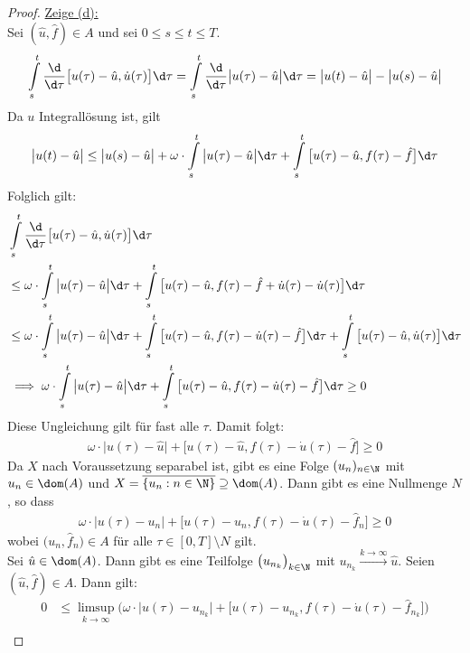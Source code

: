 \begin{proof}
\underline{Zeige (d):}\\
Sei $(\hat{u},\hat{f})\in A$ und sei $0\leq s\leq t\leq T$.
\begin{align*}
\int\limits_s^t\frac{\d}{\d\tau}\big[u(\tau)-\hat{u},\dot{u}(\tau)\big]\d\tau
=\int\limits_s^t\frac{\d}{\d\tau}\big|u(\tau)-\hat{u}\big|\d\tau
=\big|u(t)-\hat{u}\big|-\big|u(s)-\hat{u}\big|
\end{align*}
Da $u$ Integrallösung ist, gilt
\begin{align*}
\big|u(t)-\hat{u}\big|\leq\big| u(s)-\hat{u}\big|+\omega\cdot \int\limits_s^t\big|u(\tau)-\hat{u}\big|\d\tau+\int\limits_s^t\big[u(\tau)-\hat{u},f(\tau)-\hat{f}\big]\d\tau
\end{align*}
Folglich gilt:
\begin{align*}
&\int\limits_s^t\frac{\d}{\d\tau}\big[u(\tau)-\hat{u},\dot{u}(\tau)\big]\d\tau\\
&\leq\omega\cdot\int\limits_s^t\big|u(\tau)-\hat{u}\big|\d\tau+\int\limits_s^t\big[u(\tau)-\hat{u},f(\tau)-\hat{f}+\dot{u}(\tau)-\dot{u}(\tau)\big]\d\tau\\
&\leq\omega\cdot\int\limits_s^t\big| u(\tau)-\hat{u}\big|\d\tau+\int\limits_s^t\big[u(\tau)-\hat{u},f(\tau)-\dot{u}(\tau)-\hat{f}\big]\d\tau
+\int\limits_s^t\big[u(\tau)-\hat{u},\dot{u}(\tau)\big]\d\tau\\
&\implies
\omega\cdot\int\limits_s^t\big|u(\tau)-\hat{u}\big|\d\tau+\int\limits_s^t\big[u(\tau)-\hat{u},f(\tau)-\dot{u}(\tau)-\hat{f}\big]\d\tau\geq0
\end{align*}
Diese Ungleichung gilt für fast alle $\tau$. Damit folgt:
\begin{align*}
\omega\cdot\big|u(\tau)-\hat{u}\big|+\big[u(\tau)-\hat{u},f(\tau)-\dot{u}(\tau)-\hat{f}\big]\geq0
\end{align*}
Da $X$ nach Voraussetzung separabel ist, gibt es eine Folge $(u_n)_{n\in\N}$ mit $u_n\in\dom(A)$ und $X=\overline{\lbrace u_n:n\in\N\rbrace}\supseteq\dom(A)$. Dann gibt es eine Nullmenge $N$, so dass
\begin{align*}
\omega\cdot\big|u(\tau)-u_n\big|+\big[u(\tau)-u_n,f(\tau)-\dot{u}(\tau)-\hat{f}_n\big]\geq0 
\end{align*}
wobei $\big(u_n,\hat{f}_n\big)\in A$ für alle $\tau\in[0,T]\setminus N$ gilt.\\
Sei $\hat{u}\in\dom(A)$. Dann gibt es eine Teilfolge $\big(u_{n_k}\big)_{k\in\N}$ mit $u_{n_k}\stackrel{k\to\infty}{\longrightarrow}\hat{u}$. Seien $(\hat{u},\hat{f})\in A$. Dann gilt:
\begin{align*}
0&\leq\limsup\limits_{k\to\infty}\Big(\omega\cdot\big|u(\tau)-u_{n_k}\big|+\big[u(\tau)-u_{n_k},f(\tau)-\dot{u}(\tau)-\hat{f}_{n_k}\big]\Big)\\

\end{align*}
\end{proof}
